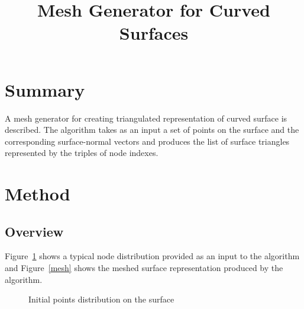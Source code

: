 \documentclass[12pt]{article}
\title{ Mesh Generator for Curved Surfaces }
\begin{document}
\maketitle
\tableofcontents
\newpage

%

\section{Summary}

A mesh generator for creating triangulated representation of curved surface is described. The algorithm takes as an input a set of points on the surface and the corresponding surface-normal vectors and produces the list of surface triangles represented by the triples of node indexes. 

\section{Method}

\subsection{Overview}

Figure~\ref{init_points} shows a typical node distribution provided as an input to the algorithm and Figure~\ref{mesh} shows the meshed surface representation produced by the algorithm.

\begin{figure}
\center
{}
\caption{\label{init_points}Initial points distribution on the surface}
\end{figure}
\end{document}
